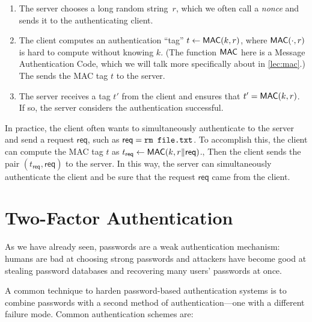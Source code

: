 
\begin{enumerate}
	\item The server chooses a long random string~$r$, which we often call a \textit{nonce} and sends it to the authenticating client.
  \item The client computes an authentication ``tag'' $t \gets \mathsf{MAC}(k, r)$, where $\mathsf{MAC}(\cdot, r)$ is hard to compute without knowing $k$.
    (The function $\mathsf{MAC}$ here is a Message Authentication Code, which we will talk more specifically about
        in \cref{lec:mac}.)
        The sends the MAC tag $t$ to the server.
  \item The server receives a tag $t'$ from the client and ensures that $t' = \mathsf{MAC}(k,r)$.
        If so, the server considers the authentication successful.
\end{enumerate}

In practice, the client often wants to simultaneously authenticate to the server
and send a request $\mathsf{req}$, such as $\mathsf{req} = \ttt{rm file.txt}$.
To accomplish this, the client can compute the MAC tag $t$ as
$t_{\mathsf{req}} \gets \mathsf{MAC}(k, r \| \mathsf{req})$.,
Then the client sends the pair $(t_{\mathsf{req}}, \mathsf{req})$ to the server.
In this way, the server can simultaneously authenticate the client
and be sure that the request $\mathsf{req}$ came from the client.

\section{Two-Factor Authentication}
As we have already seen, passwords are a weak authentication
mechanism: humans are bad at choosing strong passwords and 
attackers have become good at stealing password databases
and recovering many users' passwords at once.

A common technique to harden password-based authentication systems
is to combine passwords with a second method of 
authentication---one with a different failure mode. 
Common authentication schemes are:

